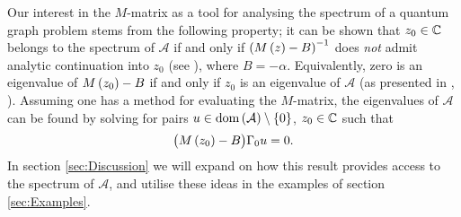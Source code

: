 Our interest in the $M$-matrix as a tool for analysing the spectrum of a quantum graph problem stems from the following property; it can be shown that $z_0\in\mathbb{C}$ belongs to the spectrum of $\mathcal{A}$ if and only if $\left( M\left( z \right) - B \right)^{-1}$ does \emph{not} admit analytic continuation into $z_0$ (see \cite[Theorem 2.1]{ershova2014isospectrality}), where $B=-\alpha$.
Equivalently, zero is an eigenvalue of $M\left( z_0 \right)-B$ if and only if $z_0$ is an eigenvalue of $\mathcal{A}$ (as presented in \cite[Proposition 1]{derkach1991generalized}, \cite[page 698]{cherednichenko2019time}).
Assuming one has a method for evaluating the $M$-matrix, the eigenvalues of $\mathcal{A}$ can be found by solving for pairs $u\in\mathrm{dom}\left( \mathcal{A} \right)\setminus\left\{ 0 \right\}$, $z_0\in\mathbb{C}$ such that
\begin{align*}
	\bigl( M\left( z_0 \right) - B \bigr) \Gamma_0 u = 0.
\end{align*}
In section \ref{sec:Discussion} we will expand on how this result provides access to the spectrum of $\mathcal{A}$, and utilise these ideas in the examples of section \ref{sec:Examples}.

